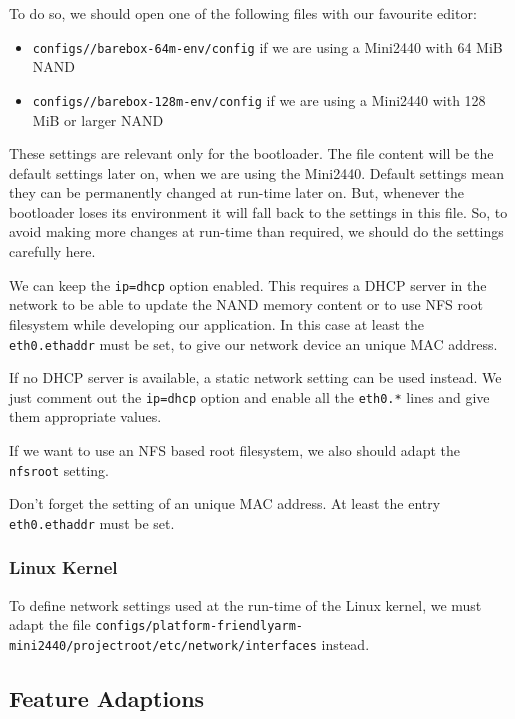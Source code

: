 To do so, we should open one of the following files with our favourite editor:

\begin{itemize}
 \item \texttt{configs/\ptxdistPlatformName /barebox-64m-env/config} if we are using
 a Mini2440 with 64 MiB NAND
 \item \texttt{configs/\ptxdistPlatformName /barebox-128m-env/config} if we are using
 a Mini2440 with 128 MiB or larger NAND
\end{itemize}

These settings are relevant only for the bootloader. The file content will be
the default settings later on, when we are using the Mini2440. Default
settings mean they can be permanently changed at run-time later on. But, whenever
the bootloader loses its environment it will fall back to the settings in this
file. So, to avoid making more changes at run-time than required, we should do the
settings carefully here.

We can keep the \texttt{ip=dhcp} option enabled. This requires a DHCP server in
the network to be able to update the NAND memory content or to use NFS root
filesystem while developing our application. In this case at least the
\texttt{eth0.ethaddr} must be set, to give our network device an unique MAC
address.

If no DHCP server is available, a static network setting can be used instead.
We just comment out the \texttt{ip=dhcp} option and enable all the
\texttt{eth0.*} lines and give them appropriate values.

If we want to use an NFS based root filesystem, we also should adapt the
\texttt{nfsroot} setting.

\begin{important}
Don't forget the setting of an unique MAC address. At least the entry
\texttt{eth0.ethaddr} must be set.
\end{important}

\subsubsection{Linux Kernel}			\label{sec:linuxnetwork}

To define network settings used at the run-time of the Linux kernel, we must
adapt the file
\texttt{configs/platform-friendlyarm-mini2440/projectroot/etc/network/interfaces}
instead.

\subsection{Feature Adaptions}		\label{sec:featureadaptions}

